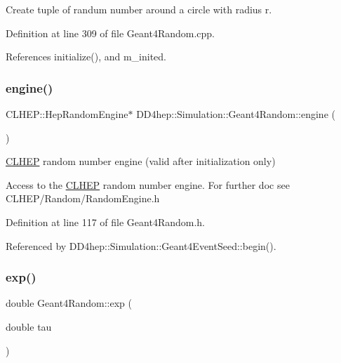 Create tuple of randum number around a circle with radius r. 



Definition at line 309 of file Geant4\+Random.\+cpp.



References initialize(), and m\+\_\+inited.

\hypertarget{class_d_d4hep_1_1_simulation_1_1_geant4_random_a80dcc27ca6d3ddc4a99f6f3b9d0d4465}{}\label{class_d_d4hep_1_1_simulation_1_1_geant4_random_a80dcc27ca6d3ddc4a99f6f3b9d0d4465} 
\subsubsection{\texorpdfstring{engine()}{engine()}}
{\footnotesize\ttfamily C\+L\+H\+E\+P\+::\+Hep\+Random\+Engine$\ast$ D\+D4hep\+::\+Simulation\+::\+Geant4\+Random\+::engine (\begin{DoxyParamCaption}{ }\end{DoxyParamCaption})\hspace{0.3cm}{\ttfamily [inline]}}



\hyperlink{namespace_c_l_h_e_p}{C\+L\+H\+EP} random number engine (valid after initialization only) 

Access to the \hyperlink{namespace_c_l_h_e_p}{C\+L\+H\+EP} random number engine. For further doc see C\+L\+H\+E\+P/\+Random/\+Random\+Engine.\+h 

Definition at line 117 of file Geant4\+Random.\+h.



Referenced by D\+D4hep\+::\+Simulation\+::\+Geant4\+Event\+Seed\+::begin().

\hypertarget{class_d_d4hep_1_1_simulation_1_1_geant4_random_a676f18f9a0f12e26e67f5390c2f6a5b7}{}\label{class_d_d4hep_1_1_simulation_1_1_geant4_random_a676f18f9a0f12e26e67f5390c2f6a5b7} 
\subsubsection{\texorpdfstring{exp()}{exp()}}
{\footnotesize\ttfamily double Geant4\+Random\+::exp (\begin{DoxyParamCaption}\item[{double}]{tau }\end{DoxyParamCaption})}



